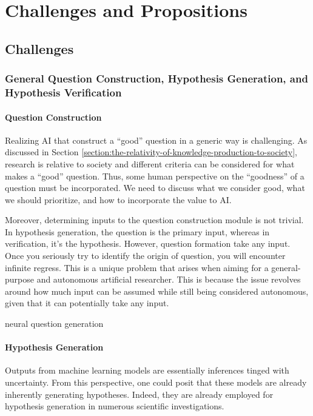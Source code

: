 \chapter{Challenges and Propositions}

\section{Challenges}

\subsection{General Question Construction, Hypothesis Generation, and Hypothesis Verification}

\subsubsection{Question Construction}

Realizing AI that construct a ``good'' question in a generic way is challenging. As discussed in Section \ref{section:the-relativity-of-knowledge-production-to-society}, research is relative to society and different criteria can be considered for what makes a ``good'' question. Thus, some human perspective on the ``goodness'' of a question must be incorporated. We need to discuss what we consider good, what we should prioritize, and how to incorporate the value to AI.

Moreover, determining inputs to the question construction module is not trivial. In hypothesis generation, the question is the primary input, whereas in verification, it's the hypothesis. However, question formation take any input. Once you seriously try to identify the origin of question, you will encounter infinite regress. This is a unique problem that arises when aiming for a general-purpose and autonomous artificial researcher. This is because the issue revolves around how much input can be assumed while still being considered autonomous, given that it can potentially take any input.

\cite{wang2023skillqg}

neural question generation \cite{pan2019recent}


\subsubsection{Hypothesis Generation}

Outputs from machine learning models are essentially inferences tinged with uncertainty. From this perspective, one could posit that these models are already inherently generating hypotheses. Indeed, they are already employed for hypothesis generation in numerous scientific investigations.

